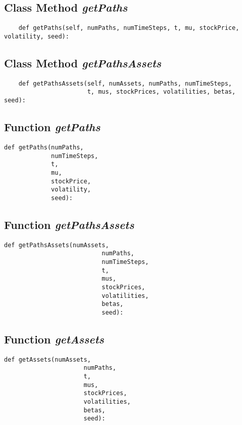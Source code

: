 \documentclass[twoside,11pt]{book}
\begin{document}
\subsection{Class Method {\it getPaths}}


\begin{lstlisting}
    def getPaths(self, numPaths, numTimeSteps, t, mu, stockPrice, volatility, seed):    
\end{lstlisting}

\subsection{Class Method {\it getPathsAssets}}


\begin{lstlisting}
    def getPathsAssets(self, numAssets, numPaths, numTimeSteps, 
                       t, mus, stockPrices, volatilities, betas, seed):    
\end{lstlisting}

\subsection{Function {\it getPaths}}


\begin{lstlisting}
def getPaths(numPaths,
             numTimeSteps,
             t,
             mu,
             stockPrice,
             volatility,
             seed):
\end{lstlisting}

\subsection{Function {\it getPathsAssets}}


\begin{lstlisting}
def getPathsAssets(numAssets,
                           numPaths,
                           numTimeSteps,
                           t,
                           mus,
                           stockPrices,
                           volatilities,
                           betas,
                           seed):    
\end{lstlisting}

\subsection{Function {\it getAssets}}


\begin{lstlisting}
def getAssets(numAssets,
                      numPaths,
                      t,
                      mus,
                      stockPrices,
                      volatilities,
                      betas,
                      seed):    
\end{lstlisting}
\end{document}

